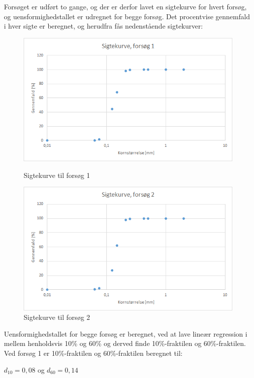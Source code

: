 Forsøget er udført to gange, og der er derfor lavet en sigtekurve for hvert forsøg, og uensformighedstallet er udregnet for begge forsøg. 
\newline \indent{     }  Det procentvise gennemfald i hver sigte er beregnet, og herudfra fås nedenstående sigtekurver: 

\begin{figure}[htbp] \centering
	\begin{minipage}[b]{0.48\textwidth}\centering
		\includegraphics[width=1.0\textwidth]{billeder/sigtekurve1.png}
		\caption{Sigtekurve til forsøg 1}
		\label{fig:sigtekurve1}
	\end{minipage}\hfill
	\begin{minipage}[b]{0.48\textwidth}\centering
		\centering
		\includegraphics[width=1.0\textwidth]{billeder/sigtekurve2.png}
		\caption{Sigtekurve til forsøg 2}
		\label{fig:sigtekurve2}
	\end{minipage}
\end{figure}

Uensformighedstallet for begge forsøg er beregnet, ved at lave lineær regression i mellem henholdsvis 10\% og 60\% og derved finde 10\%-fraktilen og 60\%-fraktilen.
\newline
\newline
Ved forsøg 1 er 10\%-fraktilen og 60\%-fraktilen beregnet til: 
\begin{center}
	$d_{10} = 0,\!08$ og $d_{60} = 0,\!14$
\end{center} 

